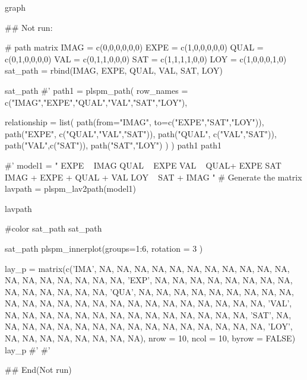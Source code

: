 \documentclass[a4paper]{book}
\begin{document}
%
\begin{Value}
graph
\end{Value}
%
\begin{Examples}
\begin{ExampleCode}

\#\# Not run: 

# path matrix
IMAG = c(0,0,0,0,0,0)
EXPE = c(1,0,0,0,0,0)
QUAL = c(0,1,0,0,0,0)
VAL = c(0,1,1,0,0,0)
SAT = c(1,1,1,1,0,0)
LOY = c(1,0,0,0,1,0)
sat_path = rbind(IMAG, EXPE, QUAL, VAL, SAT, LOY)

sat_path%
#'
path1 = plspm_path(
  row_names = c("IMAG","EXPE","QUAL","VAL","SAT","LOY"),

  relationship = list(
    path(from="IMAG", to=c("EXPE","SAT","LOY")),
    path("EXPE", c("QUAL","VAL","SAT")),
    path("QUAL", c("VAL","SAT")),
    path("VAL",c("SAT")),
    path("SAT","LOY")
  )
)
path1
path1%

#'
model1 = "
EXPE ~ IMAG
QUAL ~ EXPE
VAL ~  QUAL+ EXPE
SAT ~ IMAG + EXPE + QUAL + VAL
LOY ~ SAT + IMAG
"
# Generate the matrix
lavpath = plspm_lav2path(model1)


lavpath%

#color
sat_path %
sat_path %


sat_path %
 plspm_innerplot(groups=1:6, rotation = 3 )


lay_p = matrix(c('IMA', NA, NA, NA, NA, NA, NA, NA,
                 NA, NA, NA, NA, NA, NA, NA, NA, NA, NA, NA, 'EXP', NA,
                 NA, NA, NA, NA, NA, NA, NA, NA, NA, NA, NA, NA, NA, 'QUA',
                 NA, NA, NA, NA, NA, NA, NA, NA, NA, NA, NA, NA, NA, NA, NA,
                 NA, NA, NA, NA, NA, NA, NA, NA, NA, 'VAL', NA, NA, NA, NA,
                 NA, NA, NA, NA, NA, NA, NA, NA, NA, NA, 'SAT', NA, NA, NA,
                 NA, NA, NA, NA, NA, NA, NA, NA, NA, NA, NA, NA, NA, 'LOY',
                 NA, NA, NA, NA, NA, NA, NA, NA),
               nrow = 10, ncol = 10, byrow = FALSE)
lay_p
#'
#'

## End(Not run)


\end{ExampleCode}
\end{Examples}
\end{document}
